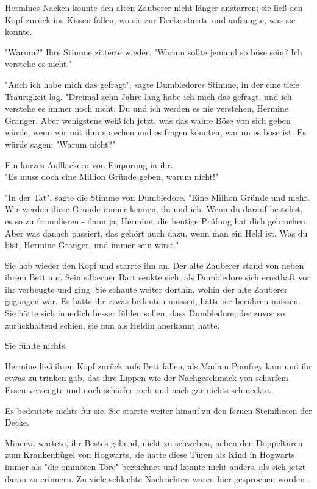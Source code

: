 {Hermines Nacken konnte den alten Zauberer nicht länger anstarren; sie ließ den Kopf zurück ins Kissen fallen, wo sie zur Decke starrte und aufsaugte, was sie konnte.

"Warum?" Ihre Stimme zitterte wieder. "Warum sollte jemand so böse sein? Ich verstehe es nicht."

"Auch ich habe mich das gefragt", sagte Dumbledores Stimme, in der eine tiefe Traurigkeit lag. "Dreimal zehn Jahre lang habe ich mich das gefragt, und ich verstehe es immer noch nicht. Du und ich werden es nie verstehen, Hermine Granger. Aber wenigstens weiß ich jetzt, was das wahre Böse von sich geben würde, wenn wir mit ihm sprechen und es fragen könnten, warum es böse ist. Es würde sagen: "Warum nicht?"

Ein kurzes Aufflackern von Empörung in ihr.\\ "Es muss doch eine Million Gründe geben, warum nicht!"

"In der Tat", sagte die Stimme von Dumbledore. "Eine Million Gründe und mehr. Wir werden diese Gründe immer kennen, du und ich. Wenn du darauf bestehst, es so zu formulieren - dann ja, Hermine, die heutige Prüfung hat dich gebrochen. Aber was danach passiert, das gehört auch dazu, wenn man ein Held ist. Was du bist, Hermine Granger, und immer sein wirst."

Sie hob wieder den Kopf und starrte ihn an. Der alte Zauberer stand von neben ihrem Bett auf. Sein silberner Bart senkte sich, als Dumbledore sich ernsthaft vor ihr verbeugte und ging. Sie schaute weiter dorthin, wohin der alte Zauberer gegangen war. Es hätte ihr etwas bedeuten müssen, hätte sie berühren müssen. Sie hätte sich innerlich besser fühlen sollen, dass Dumbledore, der zuvor so zurückhaltend schien, sie nun als Heldin anerkannt hatte.

Sie fühlte nichts.

Hermine ließ ihren Kopf zurück aufs Bett fallen, als Madam Pomfrey kam und ihr etwas zu trinken gab, das ihre Lippen wie der Nachgeschmack von scharfem Essen versengte und noch schärfer roch und nach gar nichts schmeckte.

Es bedeutete nichts für sie. Sie starrte weiter hinauf zu den fernen Steinfliesen der Decke.

Minerva wartete, ihr Bestes gebend, nicht zu schweben, neben den Doppeltüren zum Krankenflügel von Hogwarts, sie hatte diese Türen als Kind in Hogwarts immer als "die ominösen Tore" bezeichnet und konnte nicht anders, als sich jetzt daran zu erinnern. Zu viele schlechte Nachrichten waren hier gesprochen worden -

}
